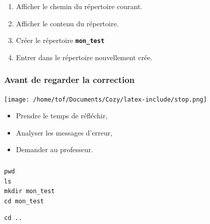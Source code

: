 \documentclass[svgnames,11pt]{beamer}
\begin{document}
\begin{frame}
    \frametitle{}

    \begin{activite}
    \begin{enumerate}
        \item Afficher le chemin du répertoire courant.
        \item Afficher le contenu du répertoire.
        \item Créer le répertoire \textbf{\texttt{mon\_test}}
        \item Entrer dans le répertoire nouvellement crée.
    \end{enumerate}
    \end{activite}

\end{frame}
\begin{frame}
    \frametitle{Avant de regarder la correction}
\begin{center}
    \centering
    \texttt{[image: /home/tof/Documents/Cozy/latex-include/stop.png]}
    \end{center}
{\Large
    \begin{itemize}
        \item Prendre le temps de réfléchir,
        \item Analyser les messages d'erreur,
        \item Demander au professeur.
    \end{itemize}
}
\end{frame}
\begin{frame}[fragile]
    \frametitle{}

\begin{center}
\begin{lstlisting}[language=Python , basicstyle=\ttfamily\small, xleftmargin=2em, xrightmargin=2em]
pwd
ls
mkdir mon_test
cd mon_test
\end{lstlisting}
\end{center}
\begin{center}
\begin{lstlisting}[language=Python , basicstyle=\ttfamily\small, xleftmargin=2em, xrightmargin=2em]
cd ..
\end{lstlisting}
\label{CODE}
\end{center}
\end{frame}
\end{document}
